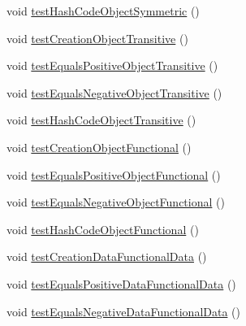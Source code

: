 \begin{DoxyCompactItemize}
\item 
void \hyperlink{classorg_1_1semanticweb_1_1owlapi_1_1datafactory_1_1_o_w_l_data_factory_test_case_a4be15f5be92c8df34f68413f002c983c}{test\-Hash\-Code\-Object\-Symmetric} ()
\item 
void \hyperlink{classorg_1_1semanticweb_1_1owlapi_1_1datafactory_1_1_o_w_l_data_factory_test_case_a6da2080a18276de34268186dc3edfb49}{test\-Creation\-Object\-Transitive} ()
\item 
void \hyperlink{classorg_1_1semanticweb_1_1owlapi_1_1datafactory_1_1_o_w_l_data_factory_test_case_a6a7cbd77dd9778e93cc4092ade82fd5a}{test\-Equals\-Positive\-Object\-Transitive} ()
\item 
void \hyperlink{classorg_1_1semanticweb_1_1owlapi_1_1datafactory_1_1_o_w_l_data_factory_test_case_a70f46f44051f9ce7bffbd73912ad3350}{test\-Equals\-Negative\-Object\-Transitive} ()
\item 
void \hyperlink{classorg_1_1semanticweb_1_1owlapi_1_1datafactory_1_1_o_w_l_data_factory_test_case_a64686cc978d1cbcd68967b9658b490dd}{test\-Hash\-Code\-Object\-Transitive} ()
\item 
void \hyperlink{classorg_1_1semanticweb_1_1owlapi_1_1datafactory_1_1_o_w_l_data_factory_test_case_a3436b49de2dc4a01a5c44a155cdf7290}{test\-Creation\-Object\-Functional} ()
\item 
void \hyperlink{classorg_1_1semanticweb_1_1owlapi_1_1datafactory_1_1_o_w_l_data_factory_test_case_a2f5dab4c72af2b1bc3666be3b3f690c9}{test\-Equals\-Positive\-Object\-Functional} ()
\item 
void \hyperlink{classorg_1_1semanticweb_1_1owlapi_1_1datafactory_1_1_o_w_l_data_factory_test_case_a8acee7c0eb01e8c977592f697aeb0a3d}{test\-Equals\-Negative\-Object\-Functional} ()
\item 
void \hyperlink{classorg_1_1semanticweb_1_1owlapi_1_1datafactory_1_1_o_w_l_data_factory_test_case_a9a1e93efe0f54171b7b59e4d072080d7}{test\-Hash\-Code\-Object\-Functional} ()
\item 
void \hyperlink{classorg_1_1semanticweb_1_1owlapi_1_1datafactory_1_1_o_w_l_data_factory_test_case_af76480b8f4fb94e4b9dde91c58e17dc4}{test\-Creation\-Data\-Functional\-Data} ()
\item 
void \hyperlink{classorg_1_1semanticweb_1_1owlapi_1_1datafactory_1_1_o_w_l_data_factory_test_case_a8648a40d4dac5fa836522c02e03e74a7}{test\-Equals\-Positive\-Data\-Functional\-Data} ()
\item 
void \hyperlink{classorg_1_1semanticweb_1_1owlapi_1_1datafactory_1_1_o_w_l_data_factory_test_case_add2c0b88527c24d5e6c564346b2e8d07}{test\-Equals\-Negative\-Data\-Functional\-Data} ()

\end{DoxyCompactItemize}
